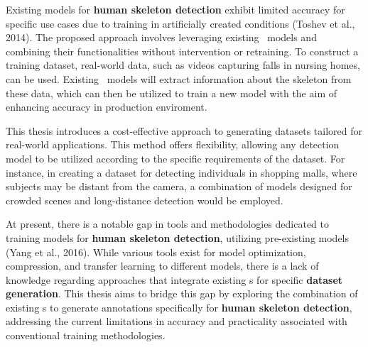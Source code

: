 Existing models for {\bf human skeleton detection} exhibit limited accuracy for specific use cases due to training in artificially created conditions (\scc Toshev et al., 2014). The proposed approach involves leveraging existing \NN\ models and combining their functionalities without intervention or retraining. To construct a training dataset, real-world data, such as videos capturing falls in nursing homes, can be used. Existing \NN\ models will extract information about the skeleton from these data, which can then be utilized to train a new model with the aim of enhancing accuracy in production enviroment.

This thesis introduces a cost-effective approach to generating datasets tailored for real-world applications. This method offers flexibility, allowing any detection model to be utilized according to the specific requirements of the dataset. For instance, in creating a dataset for detecting individuals in shopping malls, where subjects may be distant from the camera, a combination of models designed for crowded scenes and long-distance detection would be employed.


At present, there is a notable gap in tools and methodologies dedicated to training models for {\bf human skeleton detection}, utilizing pre-existing models (\scc Yang et al., 2016). While various tools exist for model optimization, compression, and transfer learning to different models, there is a lack of knowledge regarding approaches that integrate existing \NN\-s for specific {\bf dataset generation}. This thesis aims to bridge this gap by exploring the combination of existing \NN\-s to generate annotations specifically for {\bf human skeleton detection}, addressing the current limitations in accuracy and practicality associated with conventional training methodologies.
